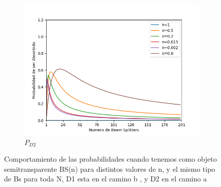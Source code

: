 \documentclass[11pt]{article}
\begin{document}
\begin{figure}[h!]
\begin{subfigure}[b]{0.45\linewidth}
\includegraphics[width=\linewidth]{Chopper_abs.png}
\caption{$P_{D2}$}
\label{fig:BS1}
\end{subfigure}
\caption{Comportamiento de las probabilidades cuando tenemos como objeto semitransparente BS(n) para distintos valores de n, y el mismo tipo de Bs para toda N, D1 esta en el camino b , y D2 en el camino a}
\label{fig:westminster}
\end{figure} 



\renewcommand{\refname}{Bibliografía}






\vspace{1 cm}
\end{document}
